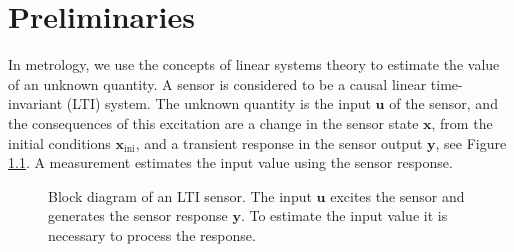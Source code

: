 \glsresetall

\chapter{Preliminaries} \label{chap:Preliminaries}


In metrology, we use the concepts of linear systems theory to estimate the value of an unknown quantity.
A sensor is considered to be a causal linear time-invariant (LTI) system.
The unknown quantity is the input $\mathbf{u}$ of the sensor, and the consequences of this excitation are a change in the sensor state $\mathbf{x}$, from the initial conditions $\mathbf{x}_{\text{ini}}$, and a transient response in the sensor output $\mathbf{y}$, see Figure \ref{fig:sysLTI}.  
A measurement estimates the input value using the sensor response.

\begin{figure}[htb!]
\centering
{}
 \caption{Block diagram of an LTI sensor. The input $\mathbf{u}$ excites the sensor and generates the sensor response $\mathbf{y}$. To estimate the input value it is necessary to process the response.} \label{fig:sysLTI}
 \end{figure}


